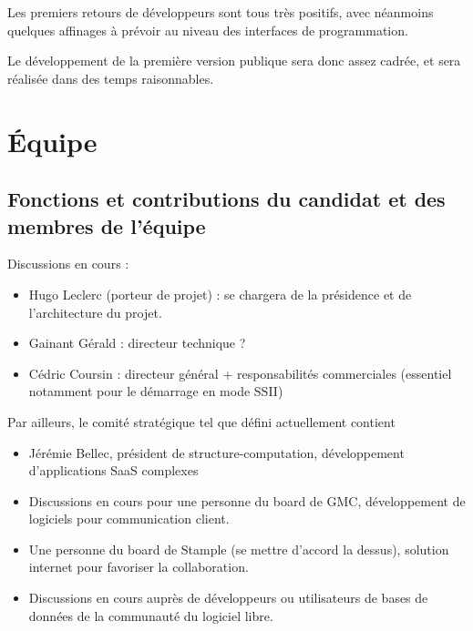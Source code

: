 \documentclass[a4paper,10pt]{scrreprt}
\begin{document}
        Les premiers retours de développeurs sont tous très positifs, avec néanmoins quelques affinages à prévoir au niveau des interfaces de programmation.
        
        Le développement de la première version publique sera donc assez cadrée, et sera réalisée dans des temps raisonnables.
        
\chapter{Équipe}

    \section{Fonctions et contributions du candidat et des membres de l’équipe}
    
        
        Discussions en cours :
        \begin{itemize}
            \item Hugo Leclerc (porteur de projet) : se chargera de la présidence et de l'architecture du projet.
            \item Gainant Gérald : directeur technique ?
            \item Cédric Coursin : directeur général + responsabilités commerciales (essentiel notamment pour le démarrage en mode SSII)
        \end{itemize}

        \medskip
        Par ailleurs, le comité stratégique tel que défini actuellement contient
        \begin{itemize}
            \item Jérémie Bellec, président de structure-computation, développement d'applications SaaS complexes
            \item Discussions en cours pour une personne du board de GMC, développement de logiciels pour communication client.
            \item Une personne du board de Stample (se mettre d'accord la dessus), solution internet pour favoriser la collaboration.
            \item Discussions en cours auprès de développeurs ou utilisateurs de bases de données de la communauté du logiciel libre.
        \end{itemize}
    
\end{document}
